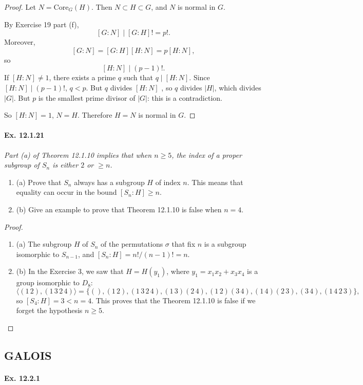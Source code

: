\documentclass[11pt,a4paper]{article}
\newcommand{\be} {\begin{enumerate}}
\newcommand{\ee} {\end{enumerate}}
\begin{document}
\begin{proof}
Let $N = \mathrm{Core}_G(H)$. Then $N \subset H \subset G$, and $N$ is normal in $G$.

By Exercise 19 part (f),
$$[G:N] \mid [G:H]! = p!.$$
Moreover, 
$$[G:N] = [G:H] [H:N] = p [H:N],$$
so $$[H:N] \mid (p-1)!.$$
If $[H:N] \ne 1$, there exists a prime $q$ such that $q\mid [H:N]$. Since $[H:N] \mid (p-1)!$, $q<p$. But $q$ divides $[H:N]$ , so $q$ divides $|H|$, which divides $|G|$. But $p$ is the smallest prime divisor of $|G|$: this is a contradiction.

So $[H:N] = 1$, $N = H$. Therefore $H = N$ is normal in $G$.
\end{proof}

\paragraph{Ex. 12.1.21}

{\it Part (a) of Theorem 12.1.10 implies that when $n\geq 5$, the index of a proper subgroup of $S_n$ is either $2$ or $\geq n$.
\be
\item[(a)] Prove that $S_n$ always has a subgroup $H$ of index $n$. This means that equality can occur in the bound $[S_n:H] \geq n$.

\item[(b)] Give an example to prove that Theorem 12.1.10 is false when $n=4$.
\ee
}

\begin{proof}
\be
\item[(a)] The subgroup $H$ of $S_n$ of the permutations $\sigma$ that fix $n$ is a subgroup isomorphic to $S_{n-1}$, and $[S_n : H ] = n!/(n-1)! = n$.
\item[(b)] In the Exercise 3, we saw that $H = H(y_1)$, where $y_1 = x_1x_2+x_3x_4$ is a group isomorphic to $D_8$:
$$\langle (1\, 2), (1\,3\,2\,4) \rangle= \{(), (1\,2), (1\,3\,2\,4), (1\,3)(2\,4), (1\,2)(3\,4), (1\,4)(2\,3), (3\,4), (1\,4\,2\,3)\},$$
so $[S_4 : H] = 3 <n=4$. This proves that the Theorem 12.1.10 is false if we forget the hypothesis $n\geq 5$.
\ee
\end{proof}

\subsection{GALOIS}

\paragraph{Ex. 12.2.1}
\end{document}
